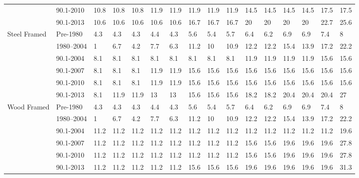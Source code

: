 \begin{table}
\begin{tabular}{p{0.4in}p{0.5in}p{0.1in}p{0.1in}p{0.1in}p{0.1in}p{0.1in}p{0.1in}p{0.1in}p{0.1in}p{0.1in}p{0.1in}p{0.1in}p{0.1in}p{0.1in}p{0.1in}}
              & 90.1-2010               & 10.8 & 10.8 & 10.8 & 11.9 & 11.9 & 11.9 & 11.9 & 11.9 & 14.5 & 14.5 & 14.5 & 14.5 & 17.5 & 17.5  \\
              & 90.1-2013               & 10.6 & 10.6 & 10.6 & 10.6 & 10.6 & 16.7 & 16.7 & 16.7 & 20   & 20   & 20   & 20   & 22.7 & 25.6  \\
Steel Framed     & Pre-1980              & 4.3  & 4.3  & 4.3  & 4.4  & 4.3  & 5.6  & 5.4  & 5.7  & 6.4  & 6.2  & 6.9  & 6.9  & 7.4  & 8     \\
              & 1980--2004               & 1    & 6.7  & 4.2  & 7.7  & 6.3  & 11.2 & 10   & 10.9 & 12.2 & 12.2 & 15.4 & 13.9 & 17.2 & 22.2  \\
              & 90.1-2004               & 8.1  & 8.1  & 8.1  & 8.1  & 8.1  & 8.1  & 8.1  & 8.1  & 11.9 & 11.9 & 11.9 & 11.9 & 15.6 & 15.6  \\
              & 90.1-2007               & 8.1  & 8.1  & 8.1  & 11.9 & 11.9 & 15.6 & 15.6 & 15.6 & 15.6 & 15.6 & 15.6 & 15.6 & 15.6 & 15.6  \\
              & 90.1-2010               & 8.1  & 8.1  & 8.1  & 11.9 & 11.9 & 15.6 & 15.6 & 15.6 & 15.6 & 15.6 & 15.6 & 15.6 & 15.6 & 15.6  \\
              & 90.1-2013               & 8.1  & 11.9 & 11.9 & 13   & 13   & 15.6 & 15.6 & 15.6 & 18.2 & 18.2 & 20.4 & 20.4 & 20.4 & 27    \\
Wood Framed      & Pre-1980              & 4.3  & 4.3  & 4.3  & 4.4  & 4.3  & 5.6  & 5.4  & 5.7  & 6.4  & 6.2  & 6.9  & 6.9  & 7.4  & 8     \\
              & 1980--2004               & 1    & 6.7  & 4.2  & 7.7  & 6.3  & 11.2 & 10   & 10.9 & 12.2 & 12.2 & 15.4 & 13.9 & 17.2 & 22.2  \\
              & 90.1-2004               & 11.2 & 11.2 & 11.2 & 11.2 & 11.2 & 11.2 & 11.2 & 11.2 & 11.2 & 11.2 & 11.2 & 11.2 & 11.2 & 19.6  \\
              & 90.1-2007               & 11.2 & 11.2 & 11.2 & 11.2 & 11.2 & 11.2 & 11.2 & 11.2 & 15.6 & 15.6 & 19.6 & 19.6 & 19.6 & 27.8  \\
              & 90.1-2010               & 11.2 & 11.2 & 11.2 & 11.2 & 11.2 & 11.2 & 11.2 & 11.2 & 15.6 & 15.6 & 19.6 & 19.6 & 19.6 & 27.8  \\
              & 90.1-2013               & 11.2 & 11.2 & 11.2 & 11.2 & 11.2 & 15.6 & 15.6 & 15.6 & 19.6 & 19.6 & 19.6 & 19.6 & 19.6 & 31.3 
\end{tabular}
\end{table}